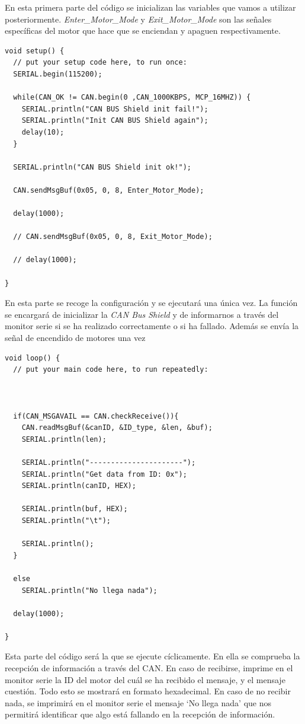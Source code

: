 En esta primera parte del código se inicializan las variables que vamos a utilizar posteriormente. \textit{Enter\_Motor\_Mode} y \textit{Exit\_Motor\_Mode} son las señales específicas del motor que hace que se enciendan y apaguen respectivamente. \cite{Katz2021} 

\begin{lstlisting}[language=Arduino, caption= Función Setup, basicstyle=\scriptsize]
void setup() {
  // put your setup code here, to run once:
  SERIAL.begin(115200);

  while(CAN_OK != CAN.begin(0 ,CAN_1000KBPS, MCP_16MHZ)) {
    SERIAL.println("CAN BUS Shield init fail!");
    SERIAL.println("Init CAN BUS Shield again");
    delay(10);
  }

  SERIAL.println("CAN BUS Shield init ok!");

  CAN.sendMsgBuf(0x05, 0, 8, Enter_Motor_Mode);

  delay(1000);

  // CAN.sendMsgBuf(0x05, 0, 8, Exit_Motor_Mode);

  // delay(1000);

}
\end{lstlisting}

En esta parte se recoge la configuración y se ejecutará una única vez. La función se encargará de inicializar la \textit{CAN Bus Shield} y de informarnos a través del monitor serie si se ha realizado correctamente o si ha fallado. Además se envía la señal de encendido de motores una vez 

\begin{lstlisting}[language=Arduino, caption= Función Loop, basicstyle=\scriptsize]
void loop() {
  // put your main code here, to run repeatedly:


  
  if(CAN_MSGAVAIL == CAN.checkReceive()){
    CAN.readMsgBuf(&canID, &ID_type, &len, &buf);
    SERIAL.println(len);
  
    SERIAL.println("----------------------");
    SERIAL.println("Get data from ID: 0x");
    SERIAL.println(canID, HEX);

    SERIAL.println(buf, HEX);
    SERIAL.println("\t");

    SERIAL.println();
  }

  else
    SERIAL.println("No llega nada");

  delay(1000);

}
\end{lstlisting}

Esta parte del código será la que se ejecute cíclicamente. En ella se comprueba la recepción de información a través del CAN. En caso de recibirse, imprime en el monitor serie la ID del motor del cuál se ha recibido el mensaje, y el mensaje cuestión. Todo esto se mostrará en formato hexadecimal. En caso de no recibir nada, se imprimirá en el monitor serie el mensaje `No llega nada' que nos permitirá identificar que algo está fallando en la recepción de información.

